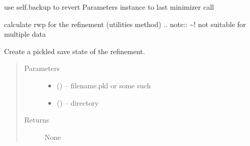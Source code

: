 \documentclass[letterpaper,10pt,english]{sphinxmanual}
\begin{document}
\begin{fulllineitems}
\begin{fulllineitems}
\begin{quote}
\begin{description}
\end{description}\end{quote}

\end{fulllineitems}


\begin{fulllineitems}
\label{\detokenize{rst/pairdistributionfunction:mstack.pairdistributionfunction.PdfRefinement.revert}}
use self.backup to revert Parameters instance to last minimizer call

\end{fulllineitems}


\begin{fulllineitems}
\label{\detokenize{rst/pairdistributionfunction:mstack.pairdistributionfunction.PdfRefinement.rwp}}
calculate rwp for the refinement (utilities method)
.. note:: \textasciitilde{}! not suitable for multiple data

\end{fulllineitems}


\begin{fulllineitems}
\label{\detokenize{rst/pairdistributionfunction:mstack.pairdistributionfunction.PdfRefinement.save}}
Create a pickled save state of the refinement.
\begin{quote}\begin{description}
\item[{Parameters}] \leavevmode\begin{itemize}
\item {} 
 () -- filename.pkl or some such

\item {} 
 () -- directory

\end{itemize}

\item[{Returns}] \leavevmode
None


\end{description}
\end{quote}
\end{fulllineitems}
\end{fulllineitems}
\end{document}
